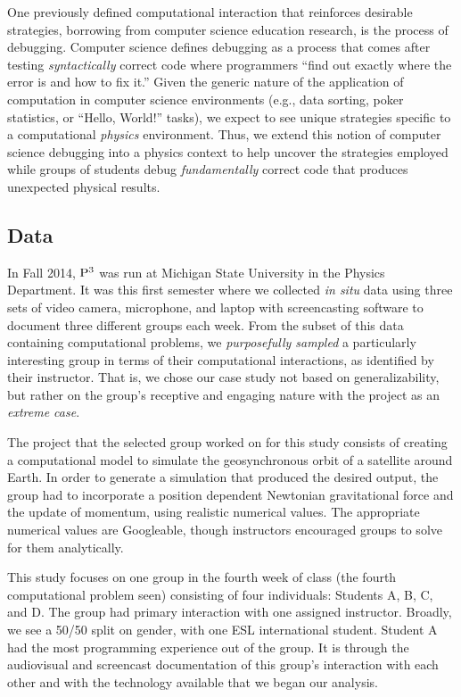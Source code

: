 \documentclass{msuphddissertation}
\begin{document}
\begin{doublespace}
One previously defined computational interaction that reinforces desirable strategies,\cite{Murphy2008} borrowing from computer science education research, is the process of debugging.  Computer science defines debugging as a process that comes after testing \emph{syntactically} correct code where programmers ``find out exactly where the error is and how to fix it.''\cite{McCauley2008}  Given the generic nature of the application of computation in computer science environments (e.g., data sorting, poker statistics, or ``Hello, World!'' tasks), we expect to see unique strategies specific to a computational \emph{physics} environment.  Thus, we extend this notion of computer science debugging into a physics context to help uncover the strategies employed while groups of students debug \emph{fundamentally} correct code that produces unexpected physical results.

\subsection{Data}

In Fall 2014, ${\rm P}^{3}$ was run at Michigan State University in the Physics Department.  It was this first semester where we collected \emph{in situ} data using three sets of video camera, microphone, and laptop with screencasting software to document three different groups each week.  From the subset of this data containing computational problems, we \emph{purposefully sampled} a particularly interesting group in terms of their computational interactions, as identified by their instructor.  That is, we chose our case study not based on generalizability, but rather on the group's receptive and engaging nature with the project as an \emph{extreme case}.\cite{Flyvbjerg2006}

The project that the selected group worked on for this study consists of creating a computational model to simulate the geosynchronous orbit of a satellite around Earth.  In order to generate a simulation that produced the desired output, the group had to incorporate a position dependent Newtonian gravitational force and the update of momentum, using realistic numerical values.  The appropriate numerical values are Googleable, though instructors encouraged groups to solve for them analytically.

This study focuses on one group in the fourth week of class (the fourth computational problem seen) consisting of four individuals: Students A, B, C, and D.  The group had primary interaction with one assigned instructor.  Broadly, we see a 50/50 split on gender, with one ESL international student.  Student A had the most programming experience out of the group.  It is through the audiovisual and screencast documentation of this group's interaction with each other and with the technology available that we began our analysis.


\end{doublespace}
\end{document}
